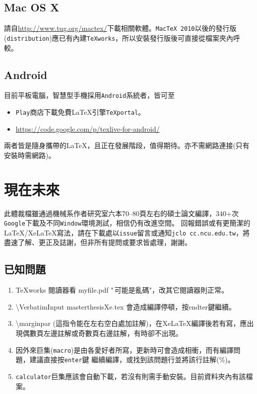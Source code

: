 \section{Mac OS X}
請自\url{http://www.tug.org/mactex/}下載相關軟體。{\tt MacTeX 2010}以後的發行版({\tt distribution})應已有內建{\tt TeXworks}，所以安裝發行版後可直接從檔案夾內呼較。
\section{Android}
目前平板電腦，智慧型手機採用{\tt Android}系統者，皆可至
\begin{itemize}
\item {\tt Play}商店下載免費\LaTeX{}引擎{\tt \TeX portal}。
\item \url{https://code.google.com/p/texlive-for-android/}
\end{itemize}
兩者皆是隨身攜帶的\LaTeX{}，且正在發展階段，值得期待。亦不需網路連接(只有安裝時需網路)。

\chapter{現在未來}
此體裁檔雖通過機械系作者研究室六本70--80頁左右的碩士論文編譯，340+次{\tt Google}下載及不同{\tt Window}環境測試，相信仍有改進空間。 回報錯誤或有更簡潔的\LaTeX{}/Xe\LaTeX{}寫法，請在下載處以{\tt issue}留言或通知{\tt jclo cc.ncu.edu.tw}，將盡速了解、更正及誌謝，但非所有提問或要求皆處理，謝謝。

\section{已知問題}
\begin{enumerate}
\item TeXworks 閱讀器看 myfile.pdf "\,可能是亂碼"，改其它閱讀器則正常。
\item \textbackslash VerbatimInput {masterthesisXe.tex} 會造成編譯停頓，按endter鍵繼續。
\item   \textbackslash marginpar (這指令能在左右空白處加註解)，在Xe\LaTeX{}編譯後若有寫，應出現偶數頁左邊註解或奇數頁右邊註解，有時卻不出現。
\item 因外來巨集({\tt macro})是由各愛好者所寫，更新時可會造成相衝，而有編譯問題，建議直接按{\tt enter}鍵 繼續編譯，或找到該問題行並將該行註解(\%)。
\item {\tt calculator}巨集應該會自動下載，若沒有則需手動安裝。目前資料夾內有該檔案。
\end{enumerate}

